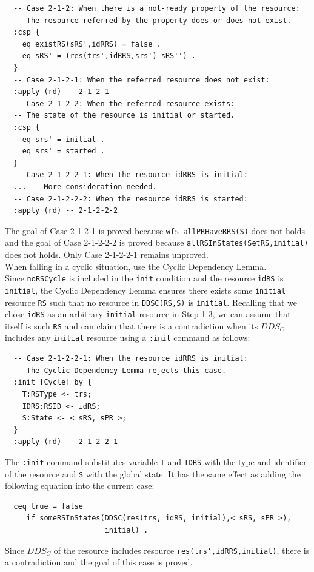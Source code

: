 \documentclass[12pt]{report}
\newcommand{\stt}[1]{{\small{\tt {#1}}}}
\begin{document}
\small
\begin{verbatim}
  -- Case 2-1-2: When there is a not-ready property of the resource:
  -- The resource referred by the property does or does not exist.
  :csp {
    eq existRS(sRS',idRRS) = false .
    eq sRS' = (res(trs',idRRS,srs') sRS'') .
  }
  -- Case 2-1-2-1: When the referred resource does not exist:
  :apply (rd) -- 2-1-2-1
  -- Case 2-1-2-2: When the referred resource exists:
  -- The state of the resource is initial or started.
  :csp { 
    eq srs' = initial .
    eq srs' = started .
  }
  -- Case 2-1-2-2-1: When the resource idRRS is initial:
  ... -- More consideration needed.
  -- Case 2-1-2-2-2: When the resource idRRS is started:
  :apply (rd) -- 2-1-2-2-2
\end{verbatim}
\normalsize
The goal of Case 2-1-2-1 is proved because \stt{wfs-allPRHaveRRS(S)}
does not holds and the goal of Case 2-1-2-2-2 is proved because
\stt{allRSInStates(SetRS,initial)} does not holds.  Only Case
2-1-2-2-1 remains unproved.\\

 When falling in a cyclic situation, use the
Cyclic Dependency Lemma. \\
Since {\tt noRSCycle} is included in the {\tt init} condition and the
resource {\tt idRS} is {\tt initial}, the Cyclic Dependency Lemma
ensures there exists some {\tt initial} resource {\tt RS} such that no
resource in \stt{DDSC(RS,S)} is {\tt initial}. Recalling that we chose
{\tt idRS} as an arbitrary {\tt initial} resource in Step 1-3, we can
assume that itself is such {\tt RS} and can claim that there is a
contradiction when its $\mathit{DDS_C}$ includes any {\tt initial} resource
using a {\tt :init} command as follows:
\small
\begin{verbatim}
  -- Case 2-1-2-2-1: When the resource idRRS is initial:
  -- The Cyclic Dependency Lemma rejects this case.
  :init [Cycle] by {
    T:RSType <- trs;
    IDRS:RSID <- idRS;
    S:State <- < sRS, sPR >;
  }
  :apply (rd) -- 2-1-2-2-1
\end{verbatim}
\normalsize
The {\tt :init} command substitutes variable {\tt T} and {\tt IDRS}
with the type and identifier of the resource and {\tt S} with the
global state. It has the same effect as adding the following equation
into the current case:
\small
\begin{verbatim}
  ceq true = false
     if someRSInStates(DDSC(res(trs, idRS, initial),< sRS, sPR >),
                       initial) .
\end{verbatim}
\normalsize
Since $\mathit{DDS_C}$ of the resource
includes resource \stt{res(trs',idRRS,initial)}, there is a
contradiction and the goal of this case is proved.
\end{document}
